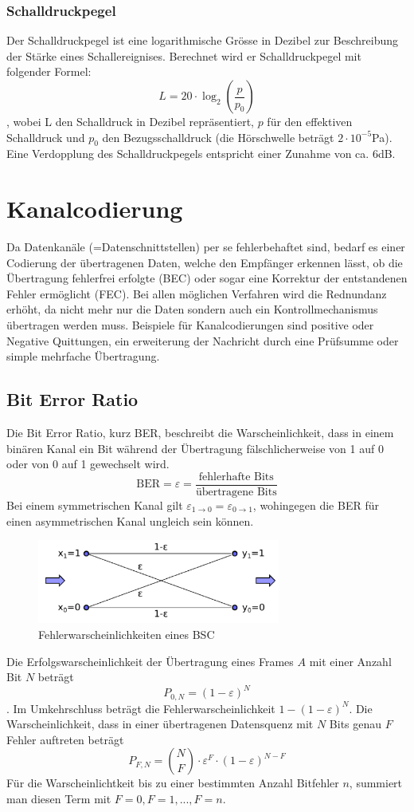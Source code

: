 \documentclass{article}
\begin{document}
\subsubsection{Schalldruckpegel}
Der Schalldruckpegel ist eine logarithmische Grösse in Dezibel zur Beschreibung der Stärke eines Schallereignises. Berechnet wird er Schalldruckpegel mit folgender Formel: 
$$L = 20 \cdot \log_{2}( \frac{p}{p_0} )$$
, wobei L den Schalldruck in Dezibel repräsentiert, $p$ für den effektiven Schalldruck und $p_0$ den Bezugsschalldruck (die Hörschwelle beträgt $2\cdot 10^{-5}$Pa). Eine Verdopplung des Schalldruckpegels entspricht einer Zunahme von ca. 6dB.
\section{Kanalcodierung}
Da Datenkanäle (=Datenschnittstellen) per se fehlerbehaftet sind, bedarf es einer Codierung der übertragenen Daten, welche den Empfänger erkennen lässt, ob die Übertragung fehlerfrei erfolgte (BEC) oder sogar eine Korrektur der entstandenen Fehler ermöglicht (FEC). Bei allen möglichen Verfahren wird die Rednundanz erhöht, da nicht mehr nur die Daten sondern auch ein Kontrollmechanismus übertragen werden muss. Beispiele für Kanalcodierungen sind positive oder Negative Quittungen, ein erweiterung der Nachricht durch eine Prüfsumme oder simple mehrfache Übertragung. 
\subsection{Bit Error Ratio}
Die Bit Error Ratio, kurz BER, beschreibt die Warscheinlichkeit, dass in einem binären Kanal ein Bit während der Übertragung fälschlicherweise von 1 auf 0 oder von 0 auf 1 gewechselt wird. 
$$\textrm{BER} = \varepsilon = \frac{\textrm{fehlerhafte Bits}}{\textrm{übertragene Bits}} $$
Bei einem symmetrischen Kanal gilt $\varepsilon_{1\to0} = \varepsilon_{0\to 1}$, wohingegen die BER für einen asymmetrischen Kanal ungleich sein können.
\begin{figure}[h]
		\begin{center}
		\includegraphics[width=8cm]{img/bsc_error.png}
		\end{center}
		\caption{Fehlerwarscheinlichkeiten eines BSC}
		\label{fig:Fehlerwarscheinlichkeiten eines BSC}
\end{figure}
Die Erfolgswarscheinlichkeit der Übertragung eines Frames $A$ mit einer Anzahl Bit $N$ beträgt $$P_{0,N} = (1-\varepsilon)^{N}$$. Im Umkehrschluss beträgt die Fehlerwarscheinlichkeit $1-(1-\varepsilon)^{N}$.
Die Warscheinlichkeit, dass in einer übertragenen Datensquenz mit $N$ Bits genau $F$ Fehler auftreten beträgt $$P_{F,N} = \binom{N}{F}\cdot \varepsilon^{F}\cdot(1-\varepsilon)^{N-F}$$
Für die Warscheinlichtkeit bis zu einer bestimmten Anzahl Bitfehler $n$, summiert man diesen Term mit $F=0, F=1, ..., F=n$.
\end{document}
